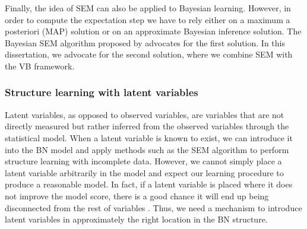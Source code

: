 

Finally, the idea of SEM can also be applied to Bayesian learning. However, in order to compute the expectation step we have to rely either on a maximum a posteriori (MAP) solution or on an approximate Bayesian inference solution. The Bayesian SEM algorithm proposed by \cite{friedman1998_bsem} advocates for the first solution. In this dissertation, we advocate for the second solution, where we combine SEM with the VB framework.

\subsubsection*{Structure learning with latent variables}

Latent variables, as opposed to observed variables, are variables that are not directly measured but rather inferred from the observed variables through the statistical model. When a latent variable is known to exist, we can introduce it into the BN model and apply methods such as the SEM algorithm to perform structure learning with incomplete data. However, we cannot simply place a latent variable arbitrarily in the model and expect our learning procedure to produce a reasonable model. In fact, if a latent variable is placed where it does not improve the model score, there is a good chance it will end up being disconnected from the rest of variables \citep{koller2009}. Thus, we need a mechanism to introduce latent variables in approximately the right location in the BN structure. 

